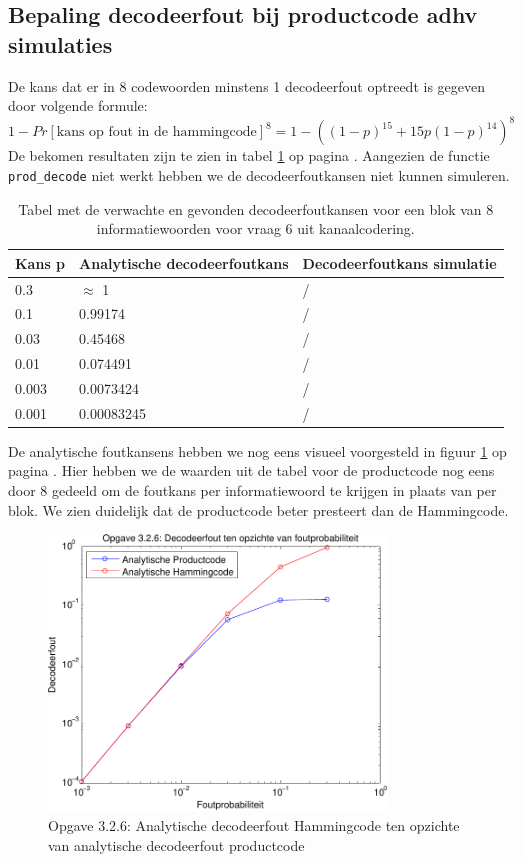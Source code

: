 \documentclass[11pt,a4paper]{article}
\begin{document}
\subsection{Bepaling decodeerfout bij productcode adhv simulaties}

De kans dat er in 8 codewoorden minstens 1 decodeerfout optreedt is gegeven door volgende formule:
\begin{equation*}
1 - Pr[\text{kans op fout in de hammingcode}]^8 = 1 - ((1-p)^{15}+15p(1-p)^{14})^8
\end{equation*}
De bekomen resultaten zijn te zien in tabel \ref{tab:1.7} op pagina \pageref{tab:1.7}. Aangezien de functie \texttt{prod\_decode} niet werkt hebben we de decodeerfoutkansen niet kunnen simuleren.

\begin{table}[h!]
\centering
\begin{tabular}{l|l|l}
Kans p & Analytische decodeerfoutkans & Decodeerfoutkans simulatie\\
\hline
0.3		&	$\approx$ 1  & / \\
0.1		& 0.99174    & / \\
0.03	& 0.45468    & / \\
0.01	& 0.074491   & / \\
0.003	& 0.0073424  & / \\
0.001	& 0.00083245 & /
\end{tabular} 
\caption{Tabel met de verwachte en gevonden decodeerfoutkansen voor een blok van 8 informatiewoorden voor vraag 6 uit kanaalcodering.}
\label{tab:1.7}
\end{table}

De analytische foutkansens hebben we nog eens visueel voorgesteld in figuur \ref{fig:3_2_6_foutprob} op pagina \pageref{fig:3_2_6_foutprob}. Hier hebben we de waarden uit de tabel voor de productcode nog eens door 8 gedeeld om de foutkans per informatiewoord te krijgen in plaats van per blok. We zien duidelijk dat de productcode beter presteert dan de Hammingcode.

\begin{figure}[h!]
  		\centering
   		\includegraphics[width=0.8\textwidth]{3_2_6_foutprob.pdf}
  		\caption{Opgave 3.2.6: Analytische decodeerfout Hammingcode ten opzichte van analytische decodeerfout productcode}
  		\label{fig:3_2_6_foutprob}
\end{figure}
\end{document}
